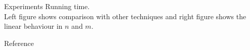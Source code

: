 \documentclass[first=dgreen,second=purple,logo=redque]{aaltoslides}
\begin{document}
\begin{frame}[allowframebreaks=1]{Experiments}
\framebreak
Running time. \\
Left figure shows comparison with other techniques and right figure shows the linear behaviour in $n$ and $m$.
\begin{figure}
 \label{fig:fgtree}
\end{figure}
\end{frame}


\begin{frame}{Reference}

\end{frame}
\end{document}
